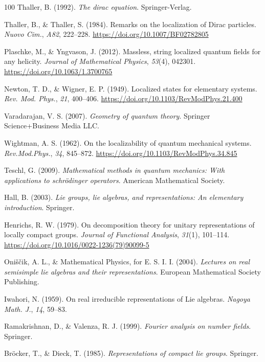 \documentclass[11pt]{book}
\begin{document}
\begin{thebibliography}{100}
 Thaller, B. (1992). \emph{The dirac equation}. Springer-Verlag.

 Thaller, B., \& Thaller, S. (1984). Remarks on the localization of Dirac
particles. \emph{Nuovo Cim.}, \emph{A82}, 222--228.
\url{https://doi.org/10.1007/BF02782805}

 Plaschke, M., \& Yngvason, J. (2012). Massless, string localized quantum
fields for any helicity. \emph{Journal of Mathematical Physics},
\emph{53}(4), 042301. \url{https://doi.org/10.1063/1.3700765}

 Newton, T. D., \& Wigner, E. P. (1949). Localized states for elementary
systems. \emph{Rev. Mod. Phys.}, \emph{21}, 400--406.
\url{https://doi.org/10.1103/RevModPhys.21.400}

 Varadarajan, V. S. (2007). \emph{Geometry of quantum theory}. Springer
Science+Business Media LLC.

 Wightman, A. S. (1962). On the localizability of quantum mechanical
systems. \emph{Rev.Mod.Phys.}, \emph{34}, 845--872.
\url{https://doi.org/10.1103/RevModPhys.34.845}

 Teschl, G. (2009). \emph{Mathematical methods in quantum mechanics: With
applications to schrödinger operators}. American Mathematical Society.

 Hall, B. (2003). \emph{Lie groups, lie algebras, and representations: An
elementary introduction}. Springer.

 Henrichs, R. W. (1979). On decomposition theory for unitary
representations of locally compact groups. \emph{Journal of Functional
Analysis}, \emph{31}(1), 101--114.
\url{https://doi.org/10.1016/0022-1236(79)90099-5}

 Oniščik, A. L., \& Mathematical Physics, for E. S. I. I. (2004).
\emph{Lectures on real semisimple lie algebras and their
representations}. European Mathematical Society Publishing.

 Iwahori, N. (1959). On real irreducible representations of Lie algebras.
\emph{Nagoya Math. J.}, \emph{14}, 59--83.

 Ramakrishnan, D., \& Valenza, R. J. (1999). \emph{Fourier analysis on
number fields}. Springer.

 Bröcker, T., \& Dieck, T. (1985). \emph{Representations of compact lie
groups}. Springer.


\end{thebibliography}
\end{document}
